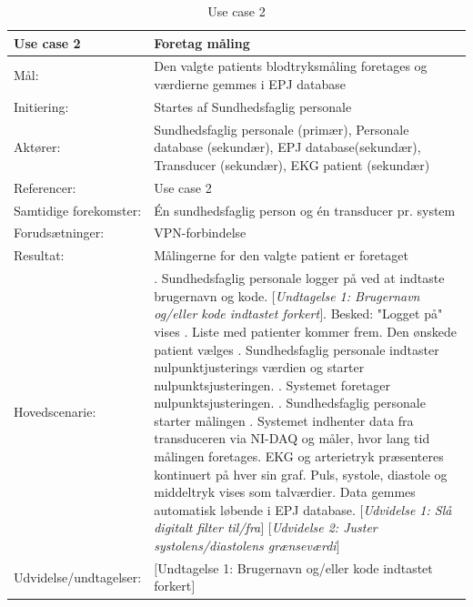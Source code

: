 \begin{table}[H]
\caption{Use case 2}\label{tab:tabel5}
\begin{tabular}{| l | >{\raggedright\arraybackslash}p{11cm} |}
   \hline
   \textbf{Use case 2} & \textbf{Foretag måling}\\ \hline
   Mål: & Den valgte patients blodtryksmåling foretages og værdierne gemmes i EPJ database\\ \hline
   Initiering: & Startes af Sundhedsfaglig personale\\ \hline
   Aktører:& Sundhedsfaglig personale (primær), Personale database (sekundær), EPJ database(sekundær), Transducer (sekundær), EKG patient (sekundær)\\ \hline
   Referencer: & Use case 2 \\ \hline
   Samtidige forekomster: & Én sundhedsfaglig person og én transducer pr. system \\\hline
   Forudsætninger: & VPN-forbindelse\\ \hline
   Resultat:& Målingerne for den valgte patient er foretaget\\ \hline
   Hovedscenarie:& 
1. Sundhedsfaglig personale logger på ved at indtaste brugernavn og kode. \newline
   \textit{$[$Undtagelse 1: Brugernavn og/eller kode indtastet forkert$]$}\newline
2. Besked: "Logget på" vises  \newline
3. Liste med patienter kommer frem\newline
4. Den ønskede patient vælges \newline
5. Sundhedsfaglig personale indtaster nulpunktjusterings værdien og starter nulpunktsjusteringen. \newline
6. Systemet foretager nulpunktsjusteringen. \newline
7. Sundhedsfaglig personale starter målingen \newline
8. Systemet indhenter data fra transduceren via NI-DAQ og måler, hvor lang tid målingen foretages\newline
9. EKG og arterietryk præsenteres kontinuert på hver sin graf. Puls, systole, diastole og middeltryk vises som talværdier. Data gemmes automatisk løbende i EPJ database. \newline
\textit{$[$Udvidelse 1: Slå digitalt filter til/fra$]$}\newline
\textit{$[$Udvidelse 2: Juster systolens/diastolens grænseværdi$]$}
 \\\hline
Udvidelse/undtagelser: & $[$Undtagelse 1: Brugernavn og/eller kode indtastet forkert$]$\newline

\end{tabular}
\end{table}
